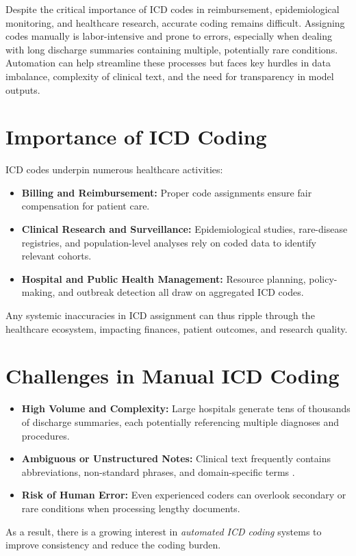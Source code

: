 \documentclass[12pt,a4paper]{report}
\begin{document}
Despite the critical importance of ICD codes in reimbursement, epidemiological monitoring, and healthcare research, accurate coding remains difficult. Assigning codes manually is labor-intensive and prone to errors, especially when dealing with long discharge summaries containing multiple, potentially rare conditions. Automation can help streamline these processes but faces key hurdles in data imbalance, complexity of clinical text, and the need for transparency in model outputs.

\section{Importance of ICD Coding}
ICD codes underpin numerous healthcare activities:
\begin{itemize}
    \item \textbf{Billing and Reimbursement:} Proper code assignments ensure fair compensation for patient care.
    \item \textbf{Clinical Research and Surveillance:} Epidemiological studies, rare-disease registries, and population-level analyses rely on coded data to identify relevant cohorts.
    \item \textbf{Hospital and Public Health Management:} Resource planning, policy-making, and outbreak detection all draw on aggregated ICD codes.
\end{itemize}
Any systemic inaccuracies in ICD assignment can thus ripple through the healthcare ecosystem, impacting finances, patient outcomes, and research quality.

\section{Challenges in Manual ICD Coding}
\begin{itemize}
    \item \textbf{High Volume and Complexity:} Large hospitals generate tens of thousands of discharge summaries, each potentially referencing multiple diagnoses and procedures.
    \item \textbf{Ambiguous or Unstructured Notes:} Clinical text frequently contains abbreviations, non-standard phrases, and domain-specific terms \cite{wrenn2010quantifying}.
    \item \textbf{Risk of Human Error:} Even experienced coders can overlook secondary or rare conditions when processing lengthy documents.
\end{itemize}
As a result, there is a growing interest in \textit{automated ICD coding} systems to improve consistency and reduce the coding burden.
\end{document}
